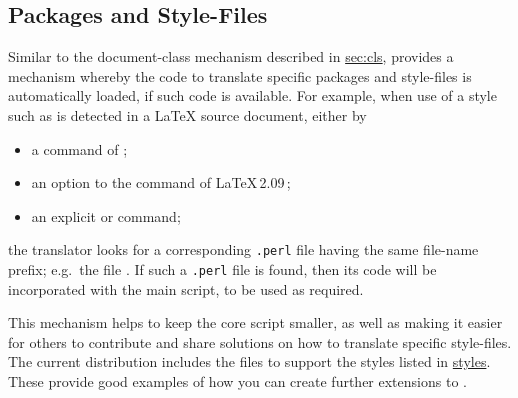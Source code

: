 \subsection{Packages and Style-Files\label{sec:sty}}
\tableofchildlinks*
{}%
\html{\\}%
%
Similar to the document-class mechanism described in
\hyperref{the previous section}{Section}{}{sec:cls},
\latextohtml{} provides a mechanism whereby the code to translate specific
packages and style-files is auto\-matic\-ally loaded, if such code is available.
For example, when use of a style such as  
is detected in a \LaTeX{} source document, either by
\begin{itemize}
\item
a  command of \LaTeXe;
\item
an option to the  command of \LaTeX\,2.09\,;
\item
an explicit  or  command;
\end{itemize}
the translator looks for a corresponding \texttt{.perl} file
having the same file-name prefix;
e.g.\ the file .
If such a \texttt{.perl} file is found, 
then its code will be incorporated with the main script,
to be used as required. 

\html{\\}%

This mechanism helps to keep the core script smaller, as well as making
it easier for others to contribute and share solutions on  
how to translate specific style-files.
The current distribution includes the files to support the styles
listed in \hyperref{the table below}{Table~}{}{styles}.
These provide good examples of how you can create 
further extensions to \latextohtml.%

